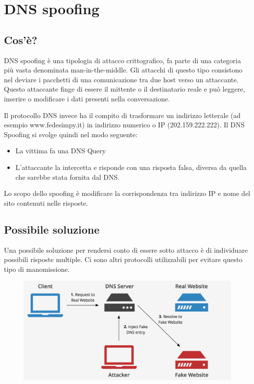 \section{DNS spoofing}
\subsection{Cos'è?}
DNS spoofing è una tipologia di attacco crittografico, fa parte di una categoria più vasta denominata man-in-the-middle. Gli attacchi di questo tipo consistono nel deviare i pacchetti di una comunicazione tra due host verso un attaccante. Questo attaccante finge di essere il mittente o il destinatario reale e può leggere, inserire o modificare i dati presenti nella conversazione.

Il protocollo DNS invece ha il compito di trasformare un indirizzo letterale (ad esempio www.fedesimpy.it) in indirizzo numerico o IP (202.159.222.222).
Il DNS Spoofing si svolge quindi nel modo seguente: 
\begin{itemize}
\item	La vittima fa una DNS Query
\item	L’attaccante la intercetta e risponde con una risposta falsa, diversa da quella che sarebbe stata fornita dal DNS.
\end{itemize}
Lo scopo dello spoofing è modificare la corrispondenza tra indirizzo IP e nome del sito contenuti nelle risposte.
\subsection{Possibile soluzione}
Una possibile soluzione per rendersi conto di essere sotto attacco è di individuare possibili risposte multiple. Ci sono altri protocolli utilizzabili per evitare questo tipo di manomissione.

\begin{figure}[H]
\centering
\includegraphics[scale=0.35]{res/img/65_DNSSpoofing.png}
\end{figure}
